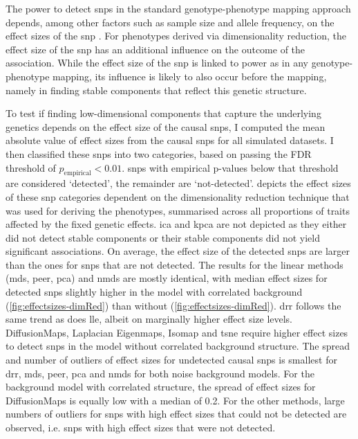 %
The power to detect \glspl{snp} in the standard genotype-phenotype mapping approach depends, among other factors such as sample size and allele frequency, on the effect sizes of the \gls{snp} \citep{Cohen1992,Halsey2015,Astle2016}.  For phenotypes derived via dimensionality reduction, the effect size of the \gls{snp} has an additional influence on the outcome of the association.  While the effect size of the \gls{snp} is linked to power as in any genotype-phenotype mapping, its influence is likely to also occur before the mapping, namely in finding stable components that reflect this genetic structure. 

To test if finding low-dimensional components that capture the underlying genetics depends on the effect size of the causal \glspl{snp}, I computed the mean absolute value of effect sizes from the causal \glspl{snp} for all simulated datasets. I then classified these \glspl{snp} into two categories, based on passing the FDR threshold of \(p_\text{empirical} < 0.01\). \glspl{snp} with empirical p-values below that threshold are considered `detected', the remainder are `not-detected'.  depicts the effect sizes of these \gls{snp} categories dependent on the dimensionality reduction technique that was used for deriving the phenotypes, summarised across all proportions of traits affected by the fixed genetic effects. \gls{ica} and \gls{kpca} are not depicted as they either did not detect stable components or their stable components did not yield significant associations. On average, the effect size of the detected \glspl{snp} are larger than the ones for \glspl{snp} that are not detected. The results for the linear methods (\gls{mds}, \gls{peer}, \gls{pca}) and \gls{nmds} are mostly identical, with median effect sizes for detected \glspl{snp} slightly higher in the model with correlated background (\cref{fig:effectsizes-dimRed}) than without (\cref{fig:effectsizes-dimRed}). \gls{drr} follows the same trend as does \gls{lle}, albeit on marginally higher effect size levels. DiffusionMaps, Laplacian Eigenmaps, Isomap and \gls{tsne} require higher effect sizes to detect \glspl{snp} in the model without correlated background structure. The spread and number of outliers of effect sizes for undetected causal \glspl{snp} is smallest for \gls{drr}, \gls{mds}, \gls{peer}, \gls{pca} and \gls{nmds} for both noise background models. For the background model with correlated structure, the spread of effect sizes for DiffusionMaps is equally low with a median of \num{0.2}. For the other methods, large numbers of outliers for \glspl{snp} with high effect sizes that could not be detected are observed, i.e. \glspl{snp} with high effect sizes that were not detected.
